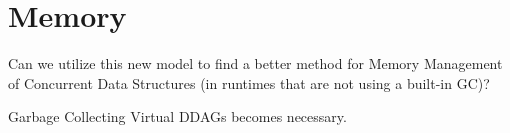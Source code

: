 \section{Memory}

Can we utilize this new model to find a better method for Memory Management of Concurrent Data Structures (in runtimes that are not using a built-in GC)?

Garbage Collecting Virtual DDAGs becomes necessary.